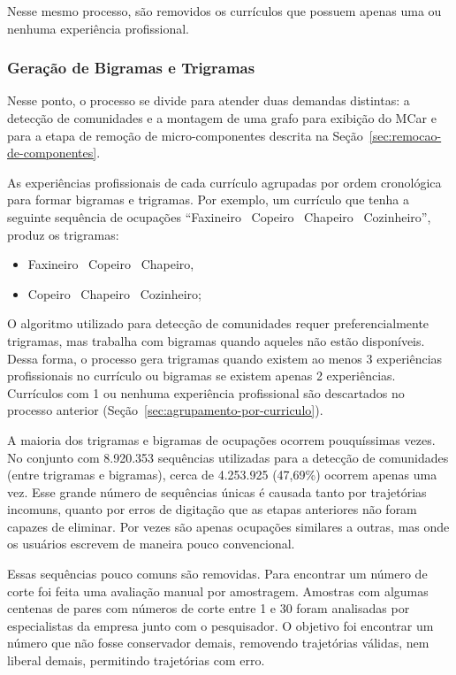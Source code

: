 \documentclass[12pt,a4paper]{article}
\begin{document}
Nesse mesmo processo, são removidos os currículos que possuem apenas uma ou nenhuma experiência profissional.


\subsubsection{Geração de Bigramas e Trigramas} \label{sec:geracao-de-trigramas}

Nesse ponto, o processo se divide para atender duas demandas distintas: a detecção de comunidades e a montagem de uma grafo para exibição do MCar e para a etapa de remoção de micro-componentes descrita na Seção~\ref{sec:remocao-de-componentes}.

As experiências profissionais de cada currículo agrupadas por ordem cronológica para formar bigramas e trigramas. Por exemplo, um currículo que tenha a seguinte sequência de ocupações \enquote{Faxineiro \textrightarrow~Copeiro \textrightarrow~Chapeiro \textrightarrow~Cozinheiro}, produz os trigramas:
\begin{itemize}
    \item  Faxineiro \textrightarrow~Copeiro \textrightarrow~Chapeiro,
    \item Copeiro \textrightarrow~Chapeiro \textrightarrow~Cozinheiro;
\end{itemize}

O algoritmo utilizado para detecção de comunidades requer preferencialmente trigramas, mas trabalha com bigramas quando aqueles não estão disponíveis. Dessa forma, o processo gera trigramas quando existem ao menos 3 experiências profissionais no currículo ou bigramas se existem apenas 2 experiências. Currículos com 1 ou nenhuma experiência profissional são descartados no processo anterior (Seção~\ref{sec:agrupamento-por-curriculo}).

A maioria dos trigramas e bigramas de ocupações ocorrem pouquíssimas vezes. No conjunto com 8.920.353 sequências utilizadas para a detecção de comunidades (entre trigramas e bigramas), cerca de 4.253.925 (47,69\%) ocorrem apenas uma vez. Esse grande número de sequências únicas é causada tanto por trajetórias incomuns, quanto por erros de digitação que as etapas anteriores não foram capazes de eliminar. Por vezes são apenas ocupações similares a outras, mas onde os usuários escrevem de maneira pouco convencional.

Essas sequências pouco comuns são removidas. Para encontrar um número de corte foi feita uma avaliação manual por amostragem. Amostras com algumas centenas de pares com números de corte entre 1 e 30 foram analisadas por especialistas da empresa junto com o pesquisador. O objetivo foi encontrar um número que não fosse conservador demais, removendo trajetórias válidas, nem liberal demais, permitindo trajetórias com erro.
\end{document}
